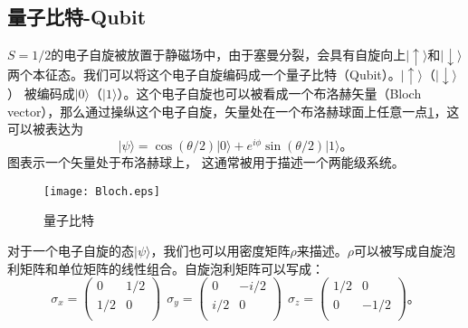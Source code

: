        \subsection{量子比特-Qubit}
        $S=1/2$的电子自旋被放置于静磁场中，由于塞曼分裂，会具有自旋向上$|\uparrow\rangle$和$|\downarrow\rangle$两个本征态。我们可以将这个电子自旋编码成一个量子比特（Qubit）。$|\uparrow\rangle$（$|\downarrow\rangle$）
        被编码成$|0\rangle$（$|1\rangle$）。这个电子自旋也可以被看成一个布洛赫矢量（Bloch vector），那么通过操纵这个电子自旋，矢量处在一个布洛赫球面上任意一点\ref{bloch-sphere}，这可以被表达为
            \begin{equation}
            \label{bloch-vector}
            |\psi\rangle = \cos (\theta/2)|0\rangle + e^{i\phi}\sin (\theta/2)|1\rangle 。
            \end{equation}
        图表示一个矢量处于布洛赫球上， 这通常被用于描述一个两能级系统。
            \begin{figure}[htbp]
            \begin{center}
              \texttt{[image: Bloch.eps]}
              \caption{量子比特
              }
              \label{bloch-sphere}
            \end{center}
            \end{figure}
        对于一个电子自旋的态$|\psi\rangle$，我们也可以用密度矩阵$\rho$来描述。$\rho$可以被写成自旋泡利矩阵和单位矩阵的线性组合。自旋泡利矩阵可以写成：
            \begin{equation}
            \label{Pauli-matrix}
                \sigma_x = \left(
                             \begin{array}{cc}
                               0 & 1/2 \\
                               1/2 & 0 \\
                             \end{array}
                           \right)~~
                \sigma_y = \left(
                             \begin{array}{cc}
                               0 & -i/2 \\
                               i/2  & 0 \\
                             \end{array}
                           \right)~~
                \sigma_z = \left(
                             \begin{array}{cc}
                               1/2 & 0 \\
                               0 & -1/2 \\
                             \end{array}
                           \right)。
            \end{equation}
